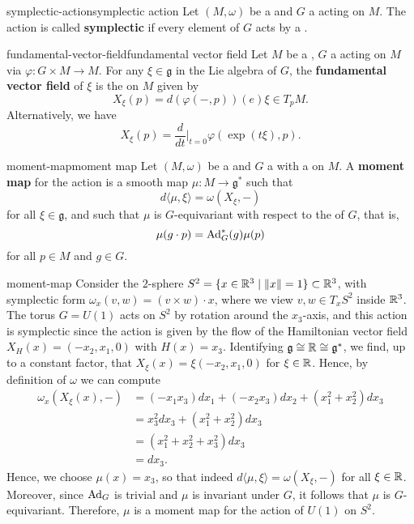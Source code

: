 \begin{topic}{symplectic-action}{symplectic action}
    Let $(M, \omega)$ be a  and $G$ a  acting on $M$. The action is called \textbf{symplectic} if every element of $G$ acts by a .
\end{topic}

\begin{topic}{fundamental-vector-field}{fundamental vector field}
    Let $M$ be a , $G$ a  acting on $M$ via $\varphi : G \times M \to M$. For any $\xi \in \mathfrak{g}$ in the Lie algebra of $G$, the \textbf{fundamental vector field} of $\xi$ is the  on $M$ given by
    \[ X_\xi(p) = d(\varphi(-, p))(e) \xi \in T_p M . \]
    Alternatively, we have
    \[ X_\xi(p) = \frac{d}{d t}\Big|_{t = 0} \varphi(\exp(t \xi), p) . \]
\end{topic}

\begin{topic}{moment-map}{moment map}
    Let $(M, \omega)$ be a  and $G$ a  with a  on $M$. A \textbf{moment map} for the action is a smooth map $\mu : M \to \mathfrak{g}^*$ such that
    \[ d \langle \mu, \xi \rangle = \omega(X_\xi, -) \]
    for all $\xi \in \mathfrak{g}$, and such that $\mu$ is $G$-equivariant with respect to the  of $G$, that is,
    \[ \mu(g \cdot p) = \textup{Ad}_G^* (g) \mu(p) \]
    for all $p \in M$ and $g \in G$.
\end{topic}

\begin{example}{moment-map}
    Consider the $2$-sphere $S^2 = \{ x \in \mathbb{R}^3 \mid \left\|x\right\| = 1 \} \subset \mathbb{R}^3$, with symplectic form $\omega_x(v, w) = (v \times w) \cdot x$, where we view $v, w \in T_x S^2$ inside $\mathbb{R}^3$. The torus $G = U(1)$ acts on $S^2$ by rotation around the $x_3$-axis, and this action is symplectic since the action is given by the flow of the Hamiltonian vector field $X_H(x) = (-x_2, x_1, 0)$ with $H(x) = x_3$. Identifying $\mathfrak{g} \cong \mathbb{R} \cong \mathfrak{g}^*$, we find, up to a constant factor, that $X_\xi(x) = \xi (-x_2, x_1, 0)$ for $\xi \in \mathbb{R}$. Hence, by definition of $\omega$ we can compute
    \[ \begin{aligned}
        \omega_x(X_\xi(x), -)
            &= (-x_1 x_3) dx_1 + (-x_2 x_3) dx_2 + (x_1^2 + x_2^2) dx_3 \\
            &= x_3^2 dx_3 + (x_1^2 + x_2^2) dx_3 \\
            &= (x_1^2 + x_2^2 + x_3^2) dx_3 \\
            &= dx_3 .
    \end{aligned} \]
    Hence, we choose $\mu(x) = x_3$, so that indeed $d \langle \mu, \xi \rangle = \omega(X_\xi, -)$ for all $\xi \in \mathbb{R}$. Moreover, since $\textup{Ad}_G$ is trivial and $\mu$ is invariant under $G$, it follows that $\mu$ is $G$-equivariant. Therefore, $\mu$ is a moment map for the action of $U(1)$ on $S^2$.
\end{example}

